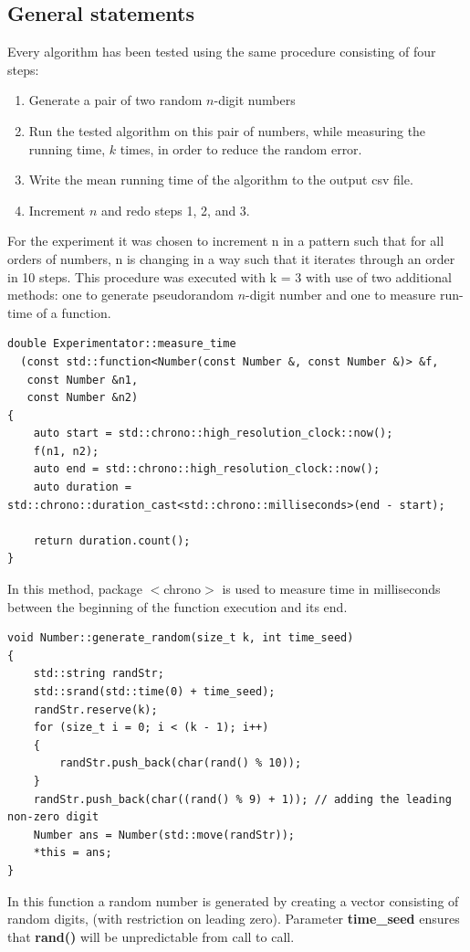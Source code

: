 \documentclass[12pt, oneside]{article}
\newenvironment{code}{\captionsetup{type=listing}}{}
\begin{document}
\subsection{General statements}
 Every algorithm has been tested using the same procedure consisting of four steps:
 \begin{enumerate}
 \item Generate a pair of two random $n$-digit numbers
 \item Run the tested algorithm on this pair of numbers, while measuring the running time, $k$ times, in order to reduce the random error. 
 \item Write the mean running time of the algorithm to the output csv file.
 \item Increment $n$ and redo steps 1, 2, and 3.
 \end{enumerate}
  For the experiment it was chosen to increment n in a pattern such that for all orders of numbers, n is changing in a way such that it iterates through an order in 10 steps. This procedure was executed with k = 3 with use of two additional methods: one to generate pseudorandom $n$-digit number and one to measure run-time of a function.

  \begin{code}

  \begin{verbatim}
double Experimentator::measure_time
  (const std::function<Number(const Number &, const Number &)> &f,
   const Number &n1,
   const Number &n2)
{
    auto start = std::chrono::high_resolution_clock::now();
    f(n1, n2);
    auto end = std::chrono::high_resolution_clock::now();
    auto duration = std::chrono::duration_cast<std::chrono::milliseconds>(end - start);

    return duration.count();
}

  \end{verbatim}
  \end{code}
  In this method, package $<$chrono$>$ is used to measure time in milliseconds between the beginning of the function execution and its end.
    \begin{code}


  \begin{verbatim}
void Number::generate_random(size_t k, int time_seed)
{
    std::string randStr;
    std::srand(std::time(0) + time_seed);
    randStr.reserve(k);
    for (size_t i = 0; i < (k - 1); i++)
    {
        randStr.push_back(char(rand() % 10));
    }
    randStr.push_back(char((rand() % 9) + 1)); // adding the leading non-zero digit
    Number ans = Number(std::move(randStr));
    *this = ans;
}
  \end{verbatim}
  \end{code}
     In this function a random number is generated by creating a vector consisting of random digits, (with restriction on leading zero). Parameter 
   \textbf{time\_seed} ensures that \textbf{rand()} will be unpredictable from call to call.
   
\end{document}
